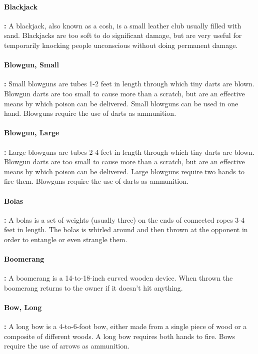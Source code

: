 \begin{multicols*}{2}
\paragraph{Blackjack}\textbf{:} A blackjack, also known as a cosh, is a small leather club usually filled with sand. Blackjacks are too soft to do significant damage, but are very useful for temporarily knocking people unconscious without doing permanent damage.

\paragraph{Blowgun, Small}\textbf{:} Small blowguns are tubes 1-2 feet in length through which tiny darts are blown. Blowgun darts are too small to cause more than a scratch, but are an effective means by which poison can be delivered. Small blowguns can be used in one hand. Blowguns require the use of darts as ammunition.

\paragraph{Blowgun, Large}\textbf{:} Large blowguns are tubes 2-4 feet in length through which tiny darts are blown. Blowgun darts are too small to cause more than a scratch, but are an effective means by which poison can be delivered. Large blowguns require two hands to fire them. Blowguns require the use of darts as ammunition.

\paragraph{Bolas}\textbf{:} A bolas is a set of weights (usually three) on the ends of connected ropes 3-4 feet in length. The bolas is whirled around and then thrown at the opponent in order to entangle or even strangle them.

\paragraph{Boomerang}\textbf{:} A boomerang is a 14-to-18-inch curved wooden device. When thrown the boomerang returns to the owner if it doesn’t hit anything.

\paragraph{Bow, Long}\textbf{:} A long bow is a 4-to-6-foot bow, either made from a single piece of wood or a composite of different woods. A long bow requires both hands to fire. Bows require the use of arrows as ammunition.


\end{multicols*}
